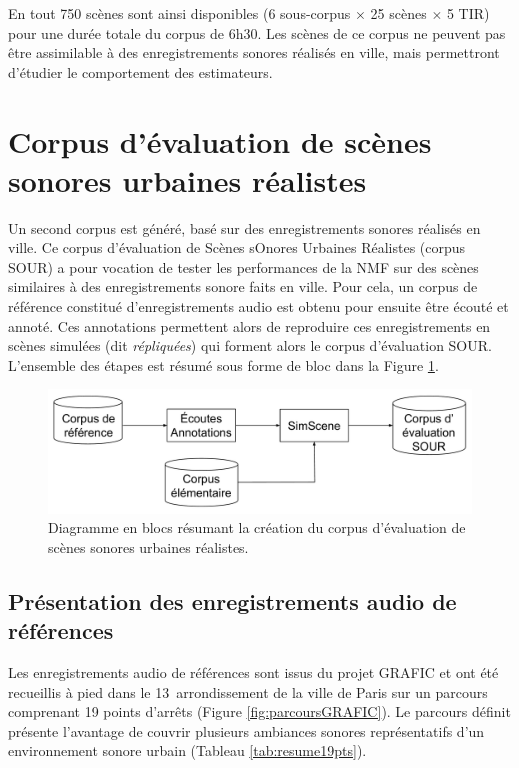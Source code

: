 En tout 750 scènes sont ainsi disponibles (6 sous-corpus $\times$ 25 scènes $\times$ 5 TIR) pour une durée totale du corpus de 6h30. Les scènes de ce corpus ne peuvent pas être assimilable à des enregistrements sonores réalisés en ville, mais permettront d'étudier le comportement des estimateurs. 

\section{Corpus d'évaluation de scènes sonores urbaines réalistes}
\label{part:corpus_grafic}

Un second corpus est généré, basé sur des enregistrements sonores réalisés en ville. Ce corpus d'évaluation de Scènes sOnores Urbaines Réalistes (corpus SOUR) a pour vocation de tester les performances de la NMF sur des scènes similaires à des enregistrements sonore faits en ville. Pour cela, un corpus de référence constitué d'enregistrements audio est obtenu pour ensuite être écouté et annoté. Ces annotations permettent alors de reproduire ces enregistrements en scènes simulées (dit \textit{répliquées}) qui forment alors le corpus d'évaluation SOUR. L'ensemble des étapes est résumé sous forme de bloc dans la Figure \ref{fig:bloc_diagram_annotation}.

\begin{figure}[ht]
\centering
\includegraphics[width=.7\textwidth]{./figures/autres/bloc_diagram_annotation.pdf}
\caption{Diagramme en blocs résumant la création du corpus d'évaluation de scènes sonores urbaines réalistes.}
\label{fig:bloc_diagram_annotation}
\end{figure}

\subsection{Présentation des enregistrements audio de références}

Les enregistrements audio de références sont issus du projet GRAFIC \cite{aumond2017modeling} et ont été recueillis à pied dans le 13\ieme~arrondissement de la ville de Paris sur un parcours comprenant 19 points d'arrêts (Figure \ref{fig:parcoursGRAFIC}). Le parcours définit présente l'avantage de couvrir plusieurs ambiances sonores représentatifs d'un environnement sonore urbain (Tableau \ref{tab:resume19pts}).\\

